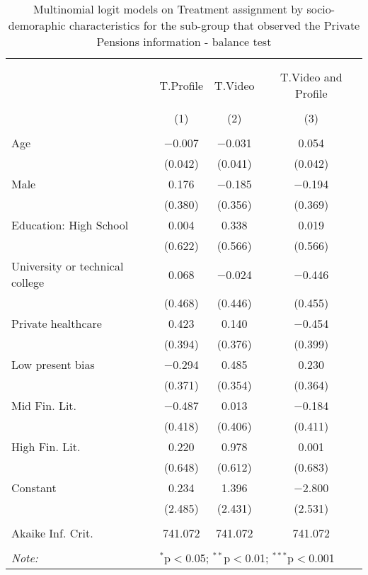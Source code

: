 
\begin{table}[H] \centering 
  \caption{Multinomial logit models on Treatment assignment by socio-demoraphic characteristics for the sub-group that observed the Private Pensions information  - balance test} 
  \label{tbl:balance_private_online} 
\begin{tabular}{@{\extracolsep{5pt}}lccc} 
\\[-1.8ex]\hline 
\hline \\[-1.8ex] 
\\[-1.8ex] & T.Profile & T.Video & T.Video and Profile \\ 
\\[-1.8ex] & (1) & (2) & (3)\\ 
\hline \\[-1.8ex] 
 Age & $-$0.007 & $-$0.031 & 0.054 \\ 
  & (0.042) & (0.041) & (0.042) \\ 
  Male & 0.176 & $-$0.185 & $-$0.194 \\ 
  & (0.380) & (0.356) & (0.369) \\ 
  Education: High School & 0.004 & 0.338 & 0.019 \\ 
  & (0.622) & (0.566) & (0.566) \\ 
  University or technical college & 0.068 & $-$0.024 & $-$0.446 \\ 
  & (0.468) & (0.446) & (0.455) \\ 
  Private healthcare & 0.423 & 0.140 & $-$0.454 \\ 
  & (0.394) & (0.376) & (0.399) \\ 
  Low present bias & $-$0.294 & 0.485 & 0.230 \\ 
  & (0.371) & (0.354) & (0.364) \\ 
  Mid Fin. Lit. & $-$0.487 & 0.013 & $-$0.184 \\ 
  & (0.418) & (0.406) & (0.411) \\ 
  High Fin. Lit. & 0.220 & 0.978 & 0.001 \\ 
  & (0.648) & (0.612) & (0.683) \\ 
  Constant & 0.234 & 1.396 & $-$2.800 \\ 
  & (2.485) & (2.431) & (2.531) \\ 
 \hline \\[-1.8ex] 
Akaike Inf. Crit. & 741.072 & 741.072 & 741.072 \\ 
\hline 
\hline \\[-1.8ex] 
\textit{Note:}  & \multicolumn{3}{l}{$^{*}$p$<$0.05; $^{**}$p$<$0.01; $^{***}$p$<$0.001} \\ 
\end{tabular} 
\end{table} 
